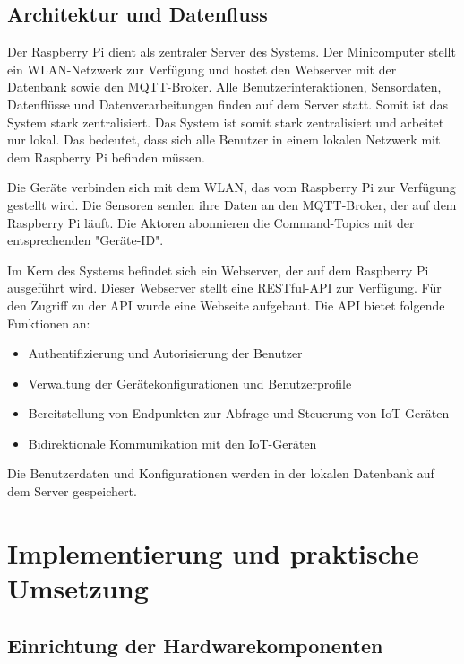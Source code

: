 \documentclass[12pt, letterpaper]{article}
\begin{document}
\subsection{Architektur und Datenfluss}
\par Der Raspberry Pi dient als zentraler Server des Systems. Der Minicomputer stellt ein WLAN-Netzwerk zur Verfügung und hostet den Webserver mit der Datenbank sowie den MQTT-Broker. Alle Benutzerinteraktionen, Sensordaten, Datenflüsse und Datenverarbeitungen finden auf dem Server statt. Somit ist das System stark zentralisiert. Das System ist somit stark zentralisiert und arbeitet nur lokal. Das bedeutet, dass sich alle Benutzer in einem lokalen Netzwerk mit dem Raspberry Pi befinden müssen. 
\par Die Geräte verbinden sich mit dem WLAN, das vom Raspberry Pi zur Verfügung gestellt wird. Die Sensoren senden ihre Daten an den MQTT-Broker, der auf dem Raspberry Pi läuft. Die Aktoren abonnieren die Command-Topics mit der entsprechenden "Geräte-ID".
\par Im Kern des Systems befindet sich ein Webserver, der auf dem Raspberry Pi ausgeführt wird. Dieser Webserver stellt eine RESTful-API zur Verfügung. Für den Zugriff zu der API wurde eine Webseite aufgebaut. Die API bietet folgende Funktionen an:
\begin{itemize}
  \item Authentifizierung und Autorisierung der Benutzer
  \item Verwaltung der Gerätekonfigurationen und Benutzerprofile
  \item Bereitstellung von Endpunkten zur Abfrage und Steuerung von IoT-Geräten
  \item Bidirektionale Kommunikation mit den IoT-Geräten
\end{itemize}
\par Die Benutzerdaten und Konfigurationen werden in der lokalen Datenbank auf dem Server gespeichert. 
\par 
\newpage
\section{Implementierung und praktische Umsetzung}
\subsection{Einrichtung der Hardwarekomponenten}
\end{document}
